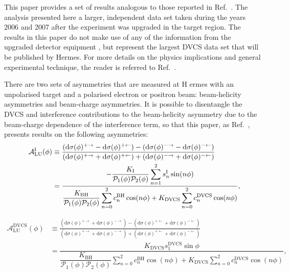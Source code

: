This paper provides a set of results analogous to those reported in
Ref.~\cite{2009a}. The analysis presented here  a larger, independent data set taken during the years 2006 and 2007 after the experiment was upgraded in the target region. 
The results in this paper do not make use of any of the information from the
upgraded detector equipment , but represent the largest DVCS data set that will
be published by H{\sc ermes}. For more details on the physics implications and general experimental technique,
the reader is referred to Ref.~\cite{2009a}.

There are two sets of asymmetries that are measured at H{\sc
ermes} with an unpolarised target and a polarised electron or positron beam:
beam-helicity asymmetries and beam-charge asymmetries. It is possible to
disentangle the DVCS and interference contributions to the beam-helicity
asymmetry due to the beam-charge dependence of the interference term, so that
this paper, as Ref.~\cite{2009a}, presents results on the following asymmetries:
\begin{align}
\hspace{0.5cm}\mathcal{A}^{\textrm{I}}_{\textrm{LU}}(\phi) &\equiv
\frac{(\textrm{d}\sigma(\phi)^{+\rightarrow} -
\textrm{d}\sigma(\phi)^{+\leftarrow}) -
(\textrm{d}\sigma(\phi)^{-\rightarrow}
- \textrm{d}\sigma(\phi)^{-\leftarrow})}{(\textrm{d}\sigma(\phi)^{+\rightarrow}
+
\textrm{d}\sigma(\phi)^{+\leftarrow}) +
(\textrm{d}\sigma(\phi)^{-\rightarrow}
+ \textrm{d}\sigma(\phi)^{-\leftarrow})}&  \nonumber \\
&=\dfrac{-\dfrac{K_{\textrm{I}}}{\mathcal{P}_{1}(\phi)\mathcal{P}_{2}(\phi)}
\displaystyle\sum_{n=1}^2
s_{n}^{\textrm{I}}\sin(n\phi)}{\dfrac{K_{\textrm{BH}}}{\mathcal{P}_{1}
(\phi)\mathcal{P}_{
2}(\phi)}
\displaystyle\sum_{n=0}^2
c_{n}^{\textrm{BH}}\cos(n\phi) + 
K_{\textrm{DVCS}}\displaystyle\sum_{n=0}^2 c_{n}^{\textrm{DVCS}}\cos(n\phi)},& 
\label{e:alui}
\end{align}

\begin{align}
\mathcal{A}^{\textrm{DVCS}}_{\textrm{LU}}(\phi) &\equiv
\frac{(\textrm{d}\sigma(\phi)^{+\rightarrow} +
\textrm{d}\sigma(\phi)^{-\rightarrow}) -
(\textrm{d}\sigma(\phi)^{+\leftarrow} + 
\textrm{d}\sigma(\phi)^{-\leftarrow})}
{(\textrm{d}\sigma(\phi)^{+\rightarrow} +
\textrm{d}\sigma(\phi)^{-\rightarrow}) +
(\textrm{d}\sigma(\phi)^{+\leftarrow}
+ \textrm{d}\sigma(\phi)^{-\leftarrow})}&  \nonumber \\
&=\dfrac{K_{\textrm{DVCS}}
s_{1}^{\textrm{DVCS}}\sin\phi}{\dfrac{K_{\textrm{BH}}}{\mathcal{P}_{1}
(\phi)\mathcal{P}_{2}(\phi)}
\displaystyle\sum_{n=0}^2
c_{n}^{\textrm{BH}}\cos(n\phi) + 
K_{\textrm{DVCS}}\displaystyle\sum_{n=0}^2 c_{n}^{\textrm{DVCS}}\cos(n\phi)},&
\label{e:aludvcs}
\end{align}

